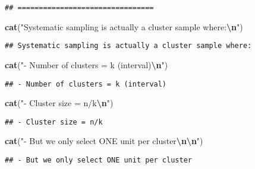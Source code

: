 \documentclass[
]{article}
\newenvironment{Shaded}{\begin{snugshade}}{\end{snugshade}}
\newcommand{\FunctionTok}[1]{\textcolor[rgb]{0.13,0.29,0.53}{\textbf{#1}}}
\newcommand{\NormalTok}[1]{#1}
\newcommand{\SpecialCharTok}[1]{\textcolor[rgb]{0.81,0.36,0.00}{\textbf{#1}}}
\newcommand{\StringTok}[1]{\textcolor[rgb]{0.31,0.60,0.02}{#1}}
\begin{document}
\begin{verbatim}
## ================================
\end{verbatim}

\begin{Shaded}
\begin{Highlighting}[]
\FunctionTok{cat}\NormalTok{(}\StringTok{"Systematic sampling is actually a cluster sample where:}\SpecialCharTok{\textbackslash{}n}\StringTok{"}\NormalTok{)}
\end{Highlighting}
\end{Shaded}

\begin{verbatim}
## Systematic sampling is actually a cluster sample where:
\end{verbatim}

\begin{Shaded}
\begin{Highlighting}[]
\FunctionTok{cat}\NormalTok{(}\StringTok{"{-} Number of clusters = k (interval)}\SpecialCharTok{\textbackslash{}n}\StringTok{"}\NormalTok{)}
\end{Highlighting}
\end{Shaded}

\begin{verbatim}
## - Number of clusters = k (interval)
\end{verbatim}

\begin{Shaded}
\begin{Highlighting}[]
\FunctionTok{cat}\NormalTok{(}\StringTok{"{-} Cluster size = n/k}\SpecialCharTok{\textbackslash{}n}\StringTok{"}\NormalTok{)}
\end{Highlighting}
\end{Shaded}

\begin{verbatim}
## - Cluster size = n/k
\end{verbatim}

\begin{Shaded}
\begin{Highlighting}[]
\FunctionTok{cat}\NormalTok{(}\StringTok{"{-} But we only select ONE unit per cluster}\SpecialCharTok{\textbackslash{}n\textbackslash{}n}\StringTok{"}\NormalTok{)}
\end{Highlighting}
\end{Shaded}

\begin{verbatim}
## - But we only select ONE unit per cluster
\end{verbatim}
\end{document}
